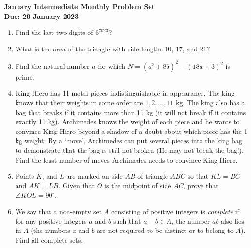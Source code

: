 \documentclass{article}
\begin{document}
\thispagestyle{empty}

\begin{center}
  \textbf{\Large January Intermediate Monthly Problem Set}
  \\ \vspace{1em}
  \textbf{\large Due: 20 January 2023}
\end{center}

\bigskip

\begin{enumerate}[itemsep=\fill]

\item %
Find the last two digits of $6^{2023}$?


\item %
What is the area of the triangle with side lengths 10, 17, and 21?


\item %
Find the natural number $a$ for which $N = (a^{2} + 85)^{2} - (18a+3)^{2}$ is prime.


\item %
King Hiero has 11 metal pieces indistinguishable in appearance.
The king knows that their weights in some order are $1,2,...,11$ kg.
The king also has a bag that breaks if it contains more than 11 kg (it will not break if it contains exactly 11 kg).
Archimedes knows the weight of each piece and he wants to convince King Hiero beyond a shadow of a doubt about which piece has the 1 kg weight.
By a `move', Archimedes can put several pieces into the king bag to demonstrate that the bag is still not broken (He may not break the bag!).
Find the least number of moves Archimedes needs to convince King Hiero. 


\item %
Points $K$, and $L$ are marked on side $AB$ of triangle $ABC$ so that $KL=BC$ and $AK=LB$. Given that $O$ is the midpoint of side $AC$, prove that $\angle{KOL} = 90^{\circ}$.


\item %
We say that a non-empty set $A$ consisting of positive integers is \emph{complete} if for any positive integers $a$ and $b$ such that $a+b\in A$, the number $ab$ also lies in $A$ (the numbers $a$ and $b$ are not required to be distinct or to belong to $A$). Find all complete sets.

\end{enumerate}
\end{document}
